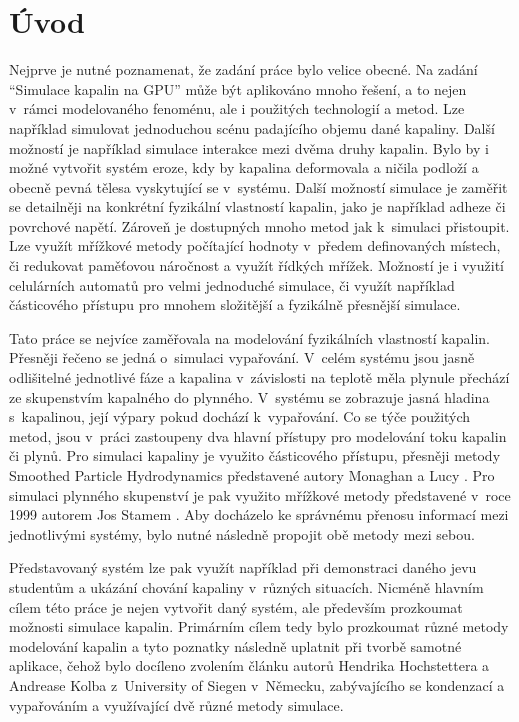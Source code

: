 \chapter{Úvod}
\label{chapter:uvod}
Nejprve je nutné poznamenat, že zadání práce bylo velice obecné. Na zadání \enquote{Simulace kapalin na GPU} může být aplikováno mnoho řešení, a to nejen v~rámci modelovaného fenoménu, ale i použitých technologií a metod. Lze například simulovat jednoduchou scénu padajícího objemu dané kapaliny. Další možností je například simulace interakce mezi dvěma druhy kapalin. Bylo by i možné vytvořit systém eroze, kdy by kapalina deformovala a ničila podloží a obecně pevná tělesa vyskytující se v~systému. Další možností simulace je zaměřit se detailněji na konkrétní fyzikální vlastností kapalin, jako je například adheze či povrchové napětí. Zároveň je dostupných mnoho metod jak k~simulaci přistoupit. Lze využít mřížkové metody počítající hodnoty v~předem definovaných místech, či redukovat paměťovou náročnost a využít řídkých mřížek. Možností je i využití celulárních automatů pro velmi jednoduché simulace, či využít například částicového přístupu pro mnohem složitější a fyzikálně přesnější simulace.

Tato práce se nejvíce zaměřovala na modelování fyzikálních vlastností kapalin. Přesněji řečeno se jedná o~simulaci vypařování. V~celém systému jsou jasně odlišitelné jednotlivé fáze a kapalina v~závislosti na teplotě měla plynule přechází ze skupenstvím kapalného do plynného. V~systému se zobrazuje jasná hladina s~kapalinou, její výpary pokud dochází k~vypařování. Co se týče použitých metod, jsou v~práci zastoupeny dva hlavní přístupy pro modelování toku kapalin či plynů. Pro simulaci kapaliny je využito částicového přístupu, přesněji metody Smoothed Particle Hydrodynamics představené autory Monaghan \cite{Monaghan77} a Lucy \cite{Lucy77}. Pro simulaci plynného skupenství je pak využito mřížkové metody představené v~roce 1999 autorem Jos Stamem \cite{Stam99}. Aby docházelo ke správnému přenosu informací mezi jednotlivými systémy, bylo nutné následně propojit obě metody mezi sebou.

Představovaný systém lze pak využít například při demonstraci daného jevu studentům a ukázání chování kapaliny v~různých situacích. Nicméně hlavním cílem této práce je nejen vytvořit daný systém, ale především prozkoumat možnosti simulace kapalin. Primárním cílem tedy bylo prozkoumat různé metody modelování kapalin a tyto poznatky následně uplatnit při tvorbě samotné aplikace, čehož bylo docíleno  zvolením článku \cite{Evap&Cond} autorů Hendrika Hochstettera a Andrease Kolba z~University of Siegen v~Německu, zabývajícího se kondenzací a vypařováním a využívající dvě různé metody simulace.


